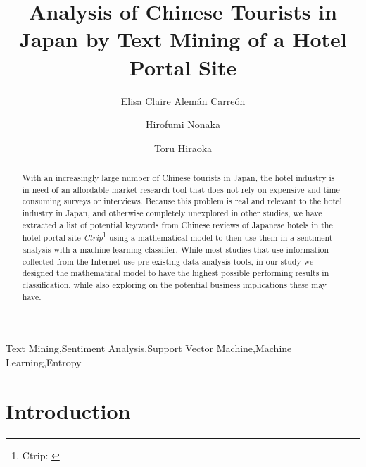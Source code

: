 \documentclass[review]{elsarticle}
\begin{document}
\begin{frontmatter}

\title{Analysis of Chinese Tourists in Japan by Text Mining of a Hotel Portal Site}

\author[gidai]{Elisa Claire Alem\'an Carre\'on
}

\author[gidai]{Hirofumi Nonaka}

\author[nagasaki]{Toru Hiraoka}

\address[gidai]{Nagaoka University of Technology, Nagaoka, Japan}
\address[nagasaki]{University of Nagasaki, Nagasaki, Japan}


\begin{abstract}

With an increasingly large number of Chinese tourists in Japan, the hotel industry is in need of an affordable market research tool that does not rely on expensive and time consuming surveys or interviews. Because this problem is real and relevant to the hotel industry in Japan, and otherwise completely unexplored in other studies, we have extracted a list of potential keywords from Chinese reviews of Japanese hotels in the hotel portal site \textit{Ctrip}\footnote{\label{ctrip}Ctrip: \href {www.ctrip.com/}{}} using a mathematical model to then use them in a sentiment analysis with a machine learning classifier. While most studies that use information collected from the Internet use pre-existing data analysis tools, in our study we designed the mathematical model to have the highest possible performing results in classification, while also exploring on the potential business implications these may have.

\end{abstract}

\begin{keyword}
Text Mining\sep Sentiment Analysis\sep Support Vector Machine\sep Machine Learning\sep Entropy
\end{keyword}

\end{frontmatter}

\section{Introduction}\label{intro}
\end{document}
